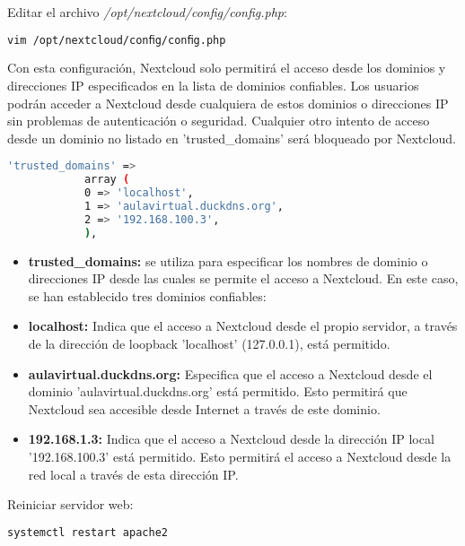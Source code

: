 \begin{enumerate}
	
			Editar el archivo \textit{/opt/nextcloud/conﬁg/conﬁg.php}:
			
			\begin{lstlisting}[language=Bash,caption=Directorio de trabajo NextCloud]
			vim /opt/nextcloud/conﬁg/conﬁg.php
			\end{lstlisting}
				
		
			Con esta configuración, Nextcloud solo permitirá el acceso desde los dominios y direcciones IP especificados en la lista de dominios confiables. Los usuarios podrán acceder a Nextcloud desde cualquiera de estos dominios o direcciones IP sin problemas de autenticación o seguridad. Cualquier otro intento de acceso desde un dominio no listado en 'trusted\_domains' será bloqueado por Nextcloud.
		
			\begin{lstlisting}[language=Bash,caption=trusted\_domains]
			'trusted_domains' =>
			array (
			0 => 'localhost',
			1 => 'aulavirtual.duckdns.org',
			2 => '192.168.100.3',
			),
			\end{lstlisting}
		
		\begin{itemize}
			\item \textbf{trusted\_domains:} se utiliza para especificar los nombres de dominio o direcciones IP desde las cuales se permite el acceso a Nextcloud. En este caso, se han establecido tres dominios confiables:
			
			\item \textbf{localhost:} Indica que el acceso a Nextcloud desde el propio servidor, a través de la dirección de loopback 'localhost' (127.0.0.1), está permitido.
				
			\item \textbf{aulavirtual.duckdns.org:} Especifica que el acceso a Nextcloud desde el dominio 'aulavirtual.duckdns.org' está permitido. Esto permitirá que Nextcloud sea accesible desde Internet a través de este dominio.
				
			\item \textbf{192.168.1.3:} Indica que el acceso a Nextcloud desde la dirección IP local '192.168.100.3' está permitido. Esto permitirá el acceso a Nextcloud desde la red local a través de esta dirección IP.

		\end{itemize}
		

		
		
		Reiniciar servidor web:
		\begin{lstlisting}[language=Bash,caption=Reiniciar Apache]
		systemctl restart apache2
		\end{lstlisting}

		\end{enumerate}
		
